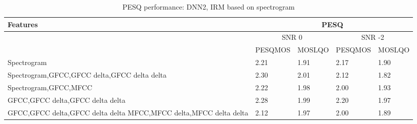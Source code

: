 \begin{enumerate}
\begin{itemize}
\begin{table}[!htbp]
\centering
\begin{tabular}{ |p{8cm}|p{1.7cm}|p{1.7cm}|p{1.7cm}|p{1.7cm}|  }
\hline
\textbf{Features} & \multicolumn{4}{|c|}{\textbf{PESQ}}\\
\hline
\cellcolor{black} & \multicolumn{2}{|c|}{SNR 0} & \multicolumn{2}{|c|}{SNR -2}\\
\hline
\cellcolor{black} & PESQMOS & MOSLQO & PESQMOS & MOSLQO\\
\hline
Spectrogram	& 2.21	& 1.91	& 2.17	& 1.90\\
\hline
\cellcolor[HTML]{ADD8E6}Spectrogram,GFCC,GFCC delta,GFCC delta delta	& \cellcolor[HTML]{ADD8E6}2.30	& \cellcolor[HTML]{ADD8E6}2.01	& 2.12	& 1.82\\
\hline
Spectrogram,GFCC,MFCC	& 2.22	& 1.98	& 2.00	& 1.93\\
\hline
\cellcolor{yellow}GFCC,GFCC delta,GFCC delta delta	& 2.28	& 1.99	& \cellcolor{yellow}2.20	& \cellcolor{yellow}1.97\\
\hline
GFCC,GFCC delta,GFCC delta delta MFCC,MFCC delta,MFCC delta delta	& 2.12	& 1.97	& 2.00	& 1.89\\
\hline
\end{tabular}
\caption{PESQ performance: DNN2, IRM based on spectrogram}
\label{tab:dnn_1_pesq_1}
\end{table}
\end{itemize}


\end{enumerate}
